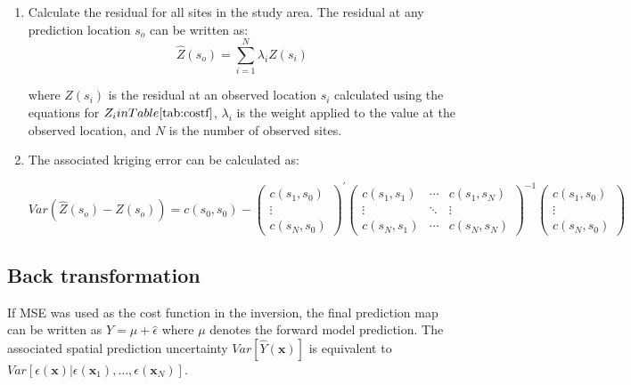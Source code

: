 \documentclass[a4paper,fleqn]{cas-sc}
\begin{document}
\begin{enumerate}
    \item Calculate the residual for all sites in the study area. The residual at any prediction location $s_{o}$ can be written as:
    \begin{equation}
    \hat{Z}(s_{o}) = \sum_{i=1}^{N} \lambda_{i} Z(s_{i}) 
    \end{equation} \label{eq:simpkrig-app}

    where $Z(s_{i})$ is the residual at an observed location $s_{i}$ calculated using the equations for $Z_{i} in Table \ref{tab:costf}$, $\lambda_{i}$ is the weight applied to the value at the observed location, and $N$ is the number of observed sites. 
    
 
    
    \item The associated kriging error can be calculated as:
    
    \begin{equation}
    Var( \hat{Z}(s_{o})-  Z(s_{o}) )=
    c(s_{0}, s_{0}) - 
    \begin{pmatrix}
    c(s_{1}, s_{0})\\ 
    \vdots \\ 
    c(s_{N}, s_{0})
    \end{pmatrix}^{'} 
    \begin{pmatrix}
    c(s_{1}, s_{1}) &  \cdots & c(s_{1}, s_{N})  \\ 
    \vdots & \ddots  & \vdots\\ 
    c(s_{N}, s_{1}) & \cdots  & c(s_{N}, s_{N})  
    \end{pmatrix}^{-1}
    \begin{pmatrix}
    c(s_{1}, s_{0})\\ 
    \vdots \\ 
    c(s_{N}, s_{0})
    \end{pmatrix} 
    \end{equation} 
 
    
\end{enumerate}


\subsection{Back transformation}\label{supp-c-back}

If MSE was used as the cost function in the inversion, the final prediction map can be written as $\widehat{Y} = \mu + \hat{\epsilon}$ where $\mu$ denotes the forward model prediction. The associated spatial prediction uncertainty $Var[\widehat{Y}(\mathbf{x})]$ is equivalent to $Var\left[\epsilon(\mathbf{x})|\epsilon(\mathbf{x}_{1}), \dots, \epsilon(\mathbf{x}_{N})\right]$.
\end{document}
